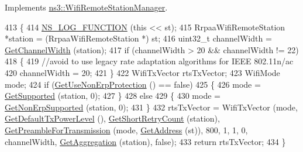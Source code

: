 Implements \hyperlink{classns3_1_1WifiRemoteStationManager_abf44eccb31d4b1b58644fd6721d132c9}{ns3\+::\+Wifi\+Remote\+Station\+Manager}.


\begin{DoxyCode}
413 \{
414   \hyperlink{log-macros-disabled_8h_a90b90d5bad1f39cb1b64923ea94c0761}{NS\_LOG\_FUNCTION} (\textcolor{keyword}{this} << st);
415   RrpaaWifiRemoteStation *station = (RrpaaWifiRemoteStation *) st;
416   uint32\_t channelWidth = \hyperlink{classns3_1_1WifiRemoteStationManager_a918213c5b9fa629c4986f6d90521bbd4}{GetChannelWidth} (station);
417   \textcolor{keywordflow}{if} (channelWidth > 20 && channelWidth != 22)
418     \{
419       \textcolor{comment}{//avoid to use legacy rate adaptation algorithms for IEEE 802.11n/ac}
420       channelWidth = 20;
421     \}
422   WifiTxVector rtsTxVector;
423   WifiMode mode;
424   \textcolor{keywordflow}{if} (\hyperlink{classns3_1_1WifiRemoteStationManager_a2d3d93f08995e554960a177a52f90f2f}{GetUseNonErpProtection} () == \textcolor{keyword}{false})
425     \{
426       mode = \hyperlink{classns3_1_1WifiRemoteStationManager_a995c8bae0d84b168fd3e8bc9ecaacdd4}{GetSupported} (station, 0);
427     \}
428   \textcolor{keywordflow}{else}
429     \{
430       mode = \hyperlink{classns3_1_1WifiRemoteStationManager_a3df8f1931f1fce653e5990a2821b44c6}{GetNonErpSupported} (station, 0);
431     \}
432   rtsTxVector = WifiTxVector (mode, \hyperlink{classns3_1_1WifiRemoteStationManager_acff2fc859ee6b4c66ea7a83dd075b5d6}{GetDefaultTxPowerLevel} (), 
      \hyperlink{classns3_1_1WifiRemoteStationManager_ad61157a9a56cf668f3255730f6a416b2}{GetShortRetryCount} (station), \hyperlink{classns3_1_1WifiRemoteStationManager_a0f44967cbd7488baada4802ebc642110}{GetPreambleForTransmission} (mode,
       \hyperlink{classns3_1_1WifiRemoteStationManager_ac9ccc8c514bd8d2af05c290e63461a2a}{GetAddress} (st)), 800, 1, 1, 0, channelWidth, \hyperlink{classns3_1_1WifiRemoteStationManager_a5421c8d510cb16eebeac9f2ea9dd73c3}{GetAggregation} (station), \textcolor{keyword}{false});
433   \textcolor{keywordflow}{return} rtsTxVector;
434 \}
\end{DoxyCode}
